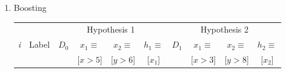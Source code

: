 \begin{enumerate}
\begin{enumerate}
  \end{enumerate}
\item Boosting

        \begin{table}[!t]
      {\centering
        \begin{tabular}{|c|c||c|c|c|c||c|c|c|c|}

          \hline
          & & \multicolumn{4}{c||}{Hypothesis 1}
	  & \multicolumn{4}{c|}{Hypothesis 2} \\
          \cline{3-10}
          {\em i} & Label & $D_0$ & $x_1 \equiv $ & $x_2 \equiv $ & $h_1\equiv$ & $D_1$ &  $x_1 \equiv $ & $x_2 \equiv $ & $h_2 \equiv $ \\
          & & & [$x >5$] & [$y > 6$] & [$x_1$] & & [$x > 3$] & [$y > 8$] & [$x_2$] \\


\end{tabular}}
\end{table}
\end{enumerate}
